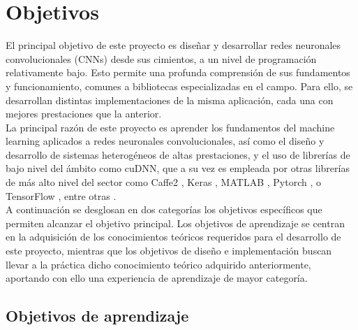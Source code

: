 \section{Objetivos}

El principal objetivo de este proyecto es diseñar y desarrollar redes neuronales convolucionales (CNNs) desde sus cimientos, a un nivel de programación relativamente bajo. Esto permite una profunda comprensión de sus fundamentos y funcionamiento, comunes a bibliotecas especializadas en el campo. Para ello, se desarrollan distintas implementaciones de la misma aplicación, cada una con mejores prestaciones que la anterior. \\
La principal razón de este proyecto es aprender los fundamentos del machine learning aplicados a redes neuronales convolucionales, así como el diseño y desarrollo de sistemas heterogéneos de altas prestaciones, y el uso de librerías de bajo nivel del ámbito como cuDNN, que a su vez es empleada por otras librerías de más alto nivel del sector como Caffe2 \cite{Caffe2}, Keras \cite{Keras}, MATLAB \cite{Matlab}, Pytorch \cite{Pytorch}, o TensorFlow \cite{Tensorflow}, entre otras \cite{cuDNN_librerias}. \\
A continuación se desglosan en dos categorías los objetivos específicos que permiten alcanzar el objetivo principal. Los objetivos de aprendizaje se centran en la adquisición de los conocimientos teóricos requeridos para el desarrollo de este proyecto, mientras que los objetivos de diseño e implementación buscan llevar a la práctica dicho conocimiento teórico adquirido anteriormente, aportando con ello una experiencia de aprendizaje de mayor categoría.

\subsection{Objetivos de aprendizaje}

